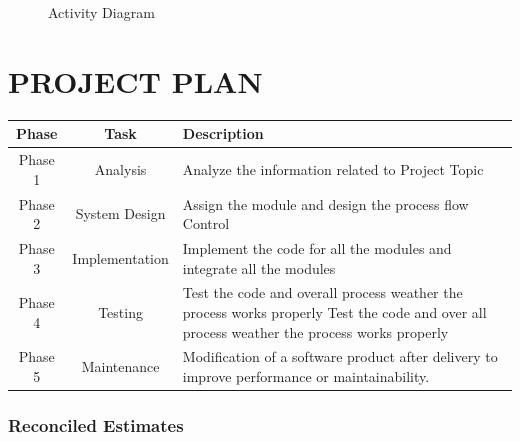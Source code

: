 \documentclass[oneside,a4paper,12pt]{report}
\begin{document}
\begin{center}
	\begin{figure}[!htbp]
		\centering
	    \caption{Activity Diagram}
	    \label{fig:Activity Diagram}
	\end{figure}
\end{center}
\chapter{PROJECT PLAN}
\def\arraystretch{1.3}
  \begin{tabular}{|c|c|p{9.2cm}|}
  \hline    
\textbf{Phase}	&\textbf{Task}	&\textbf{Description}	\\ \hline	   
Phase 1 &Analysis &Analyze the information related to Project Topic \\ \hline
Phase 2 & System Design &Assign the module and design the process flow Control \\ \hline
Phase 3 &Implementation &Implement the code for all the modules and integrate all the modules \\ \hline
Phase 4 &Testing &Test the code and overall process weather the process works
properly Test the code and over all process weather the process works properly \\ \hline
Phase 5 &Maintenance & Modification of a software product after delivery to improve performance or maintainability. \\ \hline
\end{tabular}



\subsection{Reconciled Estimates}
\end{document}
